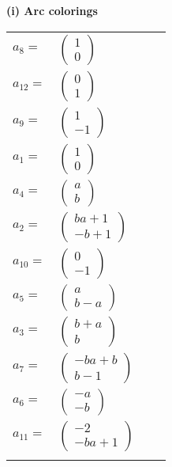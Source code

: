 \documentclass[1p]{elsarticle_modified}
\theoremstyle{definition}
\begin{document}
\flushleft \textbf{(i) Arc colorings}\\
\begin{tabular}{m{7pt} m{180pt} m{7pt} m{180pt} }
\flushright $a_{8}=$&$\begin{pmatrix}1\\0\end{pmatrix}$ \\
\flushright $a_{12}=$&$\begin{pmatrix}0\\1\end{pmatrix}$ \\
\flushright $a_{9}=$&$\begin{pmatrix}1\\-1\end{pmatrix}$ \\
\flushright $a_{1}=$&$\begin{pmatrix}1\\0\end{pmatrix}$ \\
\flushright $a_{4}=$&$\begin{pmatrix}a\\b\end{pmatrix}$ \\
\flushright $a_{2}=$&$\begin{pmatrix}b a+1\\- b+1\end{pmatrix}$ \\
\flushright $a_{10}=$&$\begin{pmatrix}0\\-1\end{pmatrix}$ \\
\flushright $a_{5}=$&$\begin{pmatrix}a\\b- a\end{pmatrix}$ \\
\flushright $a_{3}=$&$\begin{pmatrix}b+a\\b\end{pmatrix}$ \\
\flushright $a_{7}=$&$\begin{pmatrix}- b a+b\\b-1\end{pmatrix}$ \\
\flushright $a_{6}=$&$\begin{pmatrix}- a\\- b\end{pmatrix}$ \\
\flushright $a_{11}=$&$\begin{pmatrix}-2\\- b a+1\end{pmatrix}$\\&\end{tabular}
\end{document}
